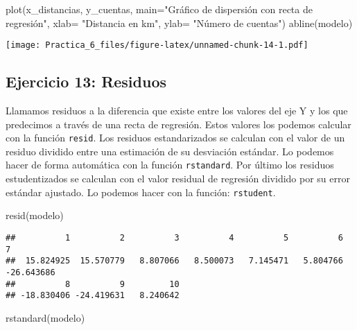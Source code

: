 \documentclass[
]{article}
\newenvironment{Shaded}{\begin{snugshade}}{\end{snugshade}}
\newcommand{\AttributeTok}[1]{\textcolor[rgb]{0.77,0.63,0.00}{#1}}
\newcommand{\FunctionTok}[1]{\textcolor[rgb]{0.00,0.00,0.00}{#1}}
\newcommand{\NormalTok}[1]{#1}
\newcommand{\StringTok}[1]{\textcolor[rgb]{0.31,0.60,0.02}{#1}}
\begin{document}
\begin{Shaded}
\begin{Highlighting}[]
\FunctionTok{plot}\NormalTok{(x\_distancias, y\_cuentas, }\AttributeTok{main=}\StringTok{"Gráfico de dispersión con recta de regresión"}\NormalTok{, }\AttributeTok{xlab=} \StringTok{"Distancia en km"}\NormalTok{, }\AttributeTok{ylab=} \StringTok{"Número de cuentas"}\NormalTok{)}
\FunctionTok{abline}\NormalTok{(modelo)}
\end{Highlighting}
\end{Shaded}

\texttt{[image: Practica\_6\_files/figure-latex/unnamed-chunk-14-1.pdf]}

\hypertarget{ejercicio-13-residuos}{%
\subsection{Ejercicio 13: Residuos}\label{ejercicio-13-residuos}}

Llamamos residuos a la diferencia que existe entre los valores del eje Y
y los que predecimos a través de una recta de regresión. Estos valores
los podemos calcular con la función \texttt{resid}. Los residuos
estandarizados se calculan con el valor de un residuo dividido entre una
estimación de su desviación estándar. Lo podemos hacer de forma
automática con la función \texttt{rstandard}. Por último los residuos
estudentizados se calculan con el valor residual de regresión dividido
por su error estándar ajustado. Lo podemos hacer con la función:
\texttt{rstudent}.

\begin{Shaded}
\begin{Highlighting}[]
\FunctionTok{resid}\NormalTok{(modelo)}
\end{Highlighting}
\end{Shaded}

\begin{verbatim}
##          1          2          3          4          5          6          7 
##  15.824925  15.570779   8.807066   8.500073   7.145471   5.804766 -26.643686 
##          8          9         10 
## -18.830406 -24.419631   8.240642
\end{verbatim}

\begin{Shaded}
\begin{Highlighting}[]
\FunctionTok{rstandard}\NormalTok{(modelo)}
\end{Highlighting}
\end{Shaded}
\end{document}
